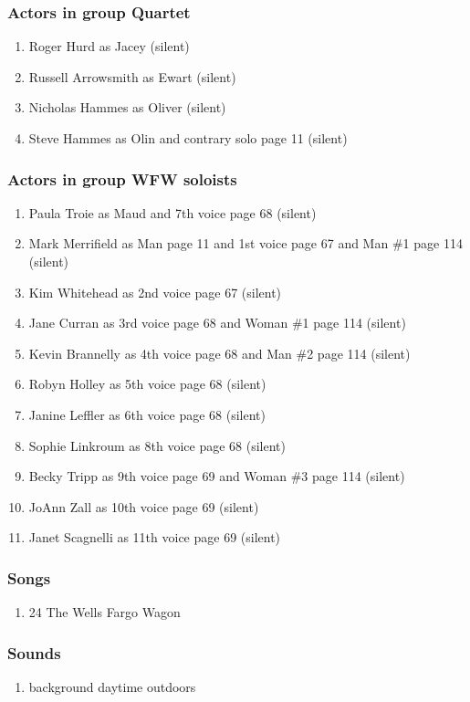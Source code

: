 \subsubsection{Actors in group Quartet}
\begin{enumerate}
\item Roger Hurd as Jacey (silent)
\item Russell Arrowsmith as Ewart (silent)
\item Nicholas Hammes as Oliver (silent)
\item Steve Hammes as Olin and contrary solo page 11 (silent)
\end{enumerate}
\subsubsection{Actors in group WFW soloists}
\begin{enumerate}
\item Paula Troie as Maud and 7th voice page 68 (silent)
\item Mark Merrifield as Man page 11 and 1st voice page 67 and Man \#1 page 114 (silent)
\item Kim Whitehead as 2nd voice page 67 (silent)
\item Jane Curran as 3rd voice page 68 and Woman \#1 page 114 (silent)
\item Kevin Brannelly as 4th voice page 68 and Man \#2 page 114 (silent)
\item Robyn Holley as 5th voice page 68 (silent)
\item Janine Leffler as 6th voice page 68 (silent)
\item Sophie Linkroum as 8th voice page 68 (silent)
\item Becky Tripp as 9th voice page 69 and Woman \#3 page 114 (silent)
\item JoAnn Zall as 10th voice page 69 (silent)
\item Janet Scagnelli as 11th voice page 69 (silent)
\end{enumerate}

\subsubsection{Songs}
\begin{enumerate}
\item 24 The Wells Fargo Wagon
\end{enumerate}\subsubsection{Sounds}
\begin{enumerate}
\item background daytime outdoors
\end{enumerate}
